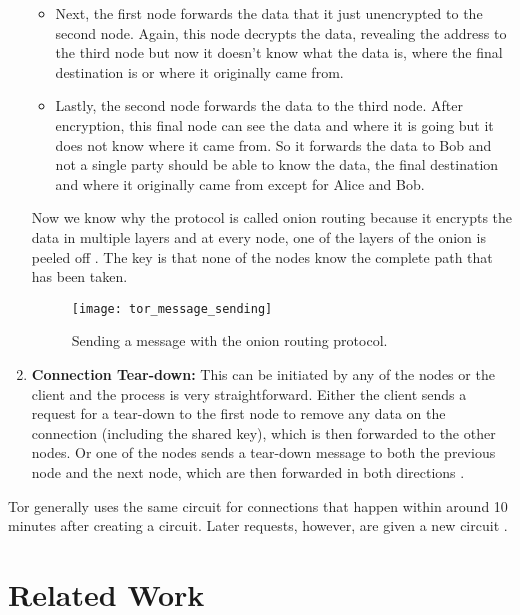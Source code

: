 \begin{enumerate}
\begin{itemize}
      \item Next, the first node forwards the data that it just unencrypted to the second node. Again, this node decrypts the data, revealing the address to the third node
        but now it doesn't know what the data is, where the final destination is or where it originally came from.

      \item Lastly, the second node forwards the data to the third node. After encryption, this final node can see the data and where it is going but it does not know where it came from.
        So it forwards the data to Bob and not a single party should be able to know the data, the final destination and where it originally came from except for Alice and Bob.
    \end{itemize}

    Now we know why the protocol is called onion routing because it encrypts the data in multiple layers and at every node, one of the layers of the onion is peeled off \cite{tor_project2}.
    The key is that none of the nodes know the complete path that has been taken.

    \begin{figure}[ht]
      \centering
      \texttt{[image: tor\_message\_sending]}
      \caption{Sending a message with the onion routing protocol.}
      \label{fig:tor_message_sending}
    \end{figure}

  \item \textbf{Connection Tear-down:} This can be initiated by any of the nodes or the client and the process is very straightforward.
    Either the client sends a request for a tear-down to the first node to remove any data on the connection (including the shared key), which is then forwarded to the other nodes.
    Or one of the nodes sends a tear-down message to both the previous node and the next node, which are then forwarded in both directions \cite{goldschlag1999onion}.

\end{enumerate}

Tor generally uses the same circuit for connections that happen within around 10 minutes after creating a circuit.
Later requests, however, are given a new circuit \cite{tor_project, tor_project2}.

\section{Related Work}

